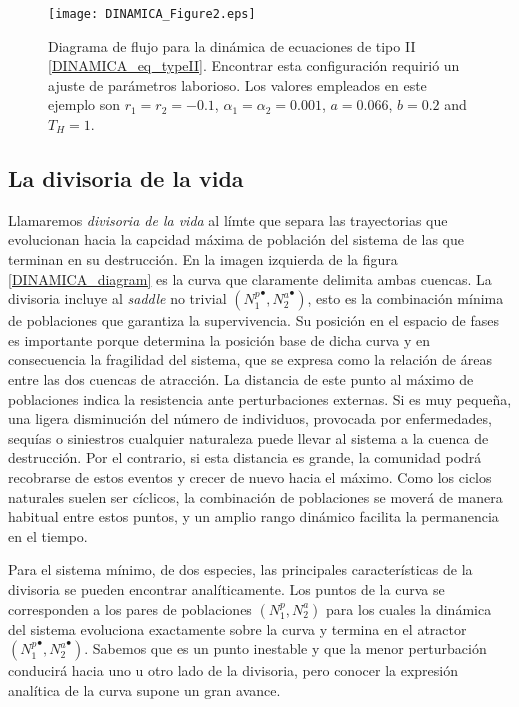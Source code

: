 \begin{figure}
\centering
\texttt{[image: DINAMICA\_Figure2.eps]}
\caption {Diagrama de flujo para la dinámica de ecuaciones de tipo II \ref{DINAMICA_eq_typeII}. Encontrar esta configuración requirió un ajuste de parámetros laborioso. Los valores empleados en este ejemplo son $r_1 = r_2 = -0.1$, $\alpha_1 = \alpha_2 = 0.001$, $a = 0.066$, $b = 0.2$ and $T_H = 1$.}
\label{DINAMICA_typeII}
\end{figure}

\subsection{La divisoria de la vida}
\label{watershed}

Llamaremos \textit{divisoria de la vida} al límte que separa las trayectorias que evolucionan hacia la capcidad máxima de población del sistema de las que terminan en su destrucción. En la imagen izquierda de la figura \ref{DINAMICA_diagram} es la curva que claramente delimita ambas cuencas. La divisoria incluye al \textit{saddle} no trivial $({N_1^p}^\bullet,{N_2^a}^\bullet)$, esto es la combinación mínima de poblaciones que garantiza la supervivencia. Su posición en el espacio de fases es importante porque determina la posición base de dicha curva y en consecuencia la fragilidad del sistema, que se expresa como la relación de áreas entre las dos cuencas de atracción. La distancia de este punto al máximo de poblaciones indica la resistencia ante perturbaciones externas. Si es muy pequeña, una ligera disminución del número de individuos, provocada por enfermedades, sequías o siniestros cualquier naturaleza puede llevar al sistema a la cuenca de destrucción. Por el contrario, si esta distancia es grande, la comunidad podrá recobrarse de estos eventos y crecer de nuevo hacia el máximo. Como los ciclos naturales suelen ser cíclicos, la combinación de poblaciones se moverá de manera habitual entre estos puntos, y un amplio rango dinámico facilita la permanencia en el tiempo. 

Para el sistema mínimo, de dos especies, las principales características de la divisoria se pueden encontrar analíticamente. Los puntos de la curva se corresponden a los pares de poblaciones $({N_1^p},{N_2^a})$ para los cuales la dinámica del sistema evoluciona exactamente sobre la curva y termina en el atractor $({N_1^p}^\bullet,{N_2^a}^\bullet)$. Sabemos que es un punto inestable y que la menor perturbación conducirá hacia uno u otro lado de la divisoria, pero conocer la expresión analítica de la curva supone un gran avance.  

